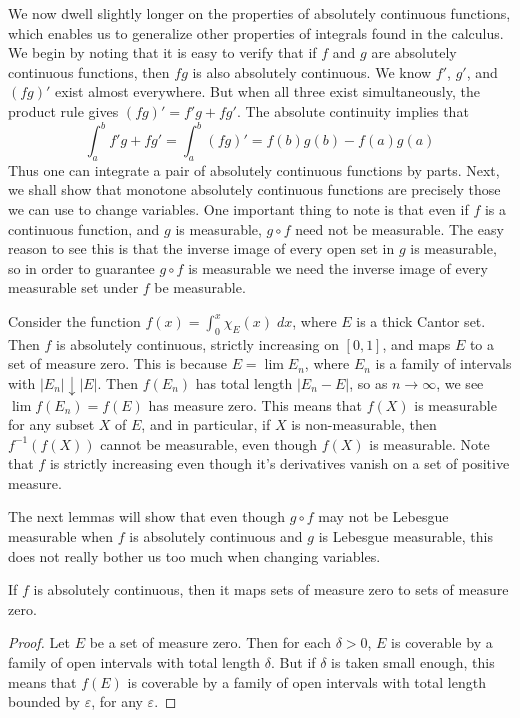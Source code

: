 We now dwell slightly longer on the properties of absolutely continuous functions, which enables us to generalize other properties of integrals found in the calculus. We begin by noting that it is easy to verify that if $f$ and $g$ are absolutely continuous functions, then $fg$ is also absolutely continuous. We know $f'$, $g'$, and $(fg)'$ exist almost everywhere. But when all three exist simultaneously, the product rule gives $(fg)' = f'g + fg'$. The absolute continuity implies that
%
\[ \int_a^b f'g + fg' = \int_a^b (fg)' = f(b)g(b) - f(a)g(a) \]
%
Thus one can integrate a pair of absolutely continuous functions by parts. Next, we shall show that monotone absolutely continuous functions are precisely those we can use to change variables. One important thing to note is that even if $f$ is a continuous function, and $g$ is measurable, $g \circ f$ need not be measurable. The easy reason to see this is that the inverse image of every open set in $g$ is measurable, so in order to guarantee $g \circ f$ is measurable we need the inverse image of every measurable set under $f$ be measurable.

\begin{example}
  Consider the function $f(x) = \int_0^x \chi_E(x)\; dx$, where $E$ is a thick Cantor set. Then $f$ is absolutely continuous, strictly increasing on $[0,1]$, and maps $E$ to a set of measure zero. This is because $E = \lim E_n$, where $E_n$ is a family of intervals with $|E_n| \downarrow |E|$. Then $f(E_n)$ has total length $|E_n - E|$, so as $n \to \infty$, we see $\lim f(E_n) = f(E)$ has measure zero.  This means that $f(X)$ is measurable for any subset $X$ of $E$, and in particular, if $X$ is non-measurable, then $f^{-1}(f(X))$ cannot be measurable, even though $f(X)$ is measurable. Note that $f$ is strictly increasing even though it's derivatives vanish on a set of positive measure.
\end{example}

The next lemmas will show that even though $g \circ f$ may not be Lebesgue measurable when $f$ is absolutely continuous and $g$ is Lebesgue measurable, this does not really bother us too much when changing variables.

\begin{lemma}
  If $f$ is absolutely continuous, then it maps sets of measure zero to sets of measure zero.
\end{lemma}
\begin{proof}
  Let $E$ be a set of measure zero. Then for each $\delta > 0$, $E$ is coverable by a family of open intervals with total length $\delta$. But if $\delta$ is taken small enough, this means that $f(E)$ is coverable by a family of open intervals with total length bounded by $\varepsilon$, for any $\varepsilon$.
\end{proof}

